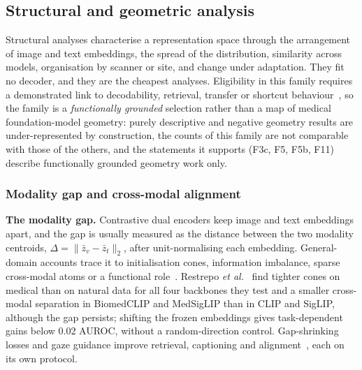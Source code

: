\subsection{Structural and geometric analysis}
\label{sec:geometry}

Structural analyses characterise a representation space through the arrangement of image and text
embeddings, the spread of the distribution, similarity across models, organisation by scanner or site,
and change under adaptation. They fit no decoder, and they are the cheapest analyses. Eligibility in this
family requires a demonstrated link to decodability, retrieval, transfer or shortcut
behaviour~\cite{geirhos2020shortcut}, so the family is a \emph{functionally grounded} selection rather
than a map of medical foundation-model geometry: purely descriptive and negative geometry results are
under-represented by construction, the counts of this family are not comparable with those of the
others, and the statements it supports (F3c, F5, F5b, F11) describe functionally grounded geometry work
only.

\subsubsection{Modality gap and cross-modal alignment}

\textbf{The modality gap.} Contrastive dual encoders keep image and text embeddings apart, and the gap
is usually measured as the distance between the two modality centroids,
$\Delta=\|\bar z_v-\bar z_t\|_2$, after unit-normalising each embedding. General-domain accounts trace
it to initialisation cones, information imbalance, sparse cross-modal atoms or a functional
role~\cite{liang2022mind,schrodi2025two,dhimoila2026crossmodal,yan2025beyond}. Restrepo \emph{et
al.}~\cite{restrepo2026cone} find tighter cones on medical than on natural data for all four backbones
they test and a smaller cross-modal separation in BiomedCLIP and MedSigLIP than in CLIP and SigLIP,
although the gap persists; shifting the frozen embeddings gives task-dependent gains below 0.02 AUROC,
without a random-direction control. Gap-shrinking losses and gaze guidance improve retrieval, captioning
and alignment~\cite{grassucci2025closing,lahmar2026bridging,kumar2024improving}, each on its own protocol.

